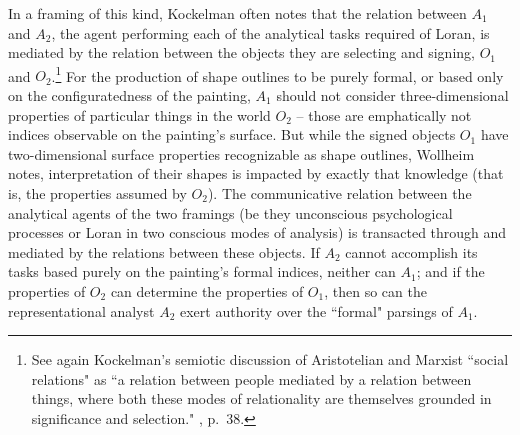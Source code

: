 In a framing of this kind, Kockelman often notes that the relation between $A_1$ and $A_2$, the agent performing each of the analytical tasks required of Loran, is mediated by the relation between the objects they are selecting and signing, $O_1$ and $O_2$.\footnote{See again Kockelman's semiotic discussion of Aristotelian and Marxist ``social relations" as ``a relation between people mediated by a relation between things, where both these modes of relationality are themselves grounded in significance and selection."  \cite{kockelman2013}, p.\ 38.}  For the production of shape outlines to be purely formal, or based only on the configuratedness of the painting, $A_1$ should not consider three-dimensional properties of particular things in the world $O_2$ -- those are emphatically not indices observable on the painting's surface.  But while the signed objects $O_1$ have two-dimensional surface properties recognizable as shape outlines, Wollheim notes, interpretation of their shapes is impacted by exactly that knowledge (that is, the properties assumed by $O_2$).  The communicative relation between the analytical agents of the two framings (be they unconscious psychological processes or Loran in two conscious modes of analysis) is transacted through and mediated by the relations between these objects.  If $A_2$ cannot accomplish its tasks based purely on the painting's formal indices, neither can $A_1$; and if the properties of $O_2$ can determine the properties of $O_1$, then so can the representational analyst $A_2$ exert authority over the ``formal" parsings of $A_1$.


